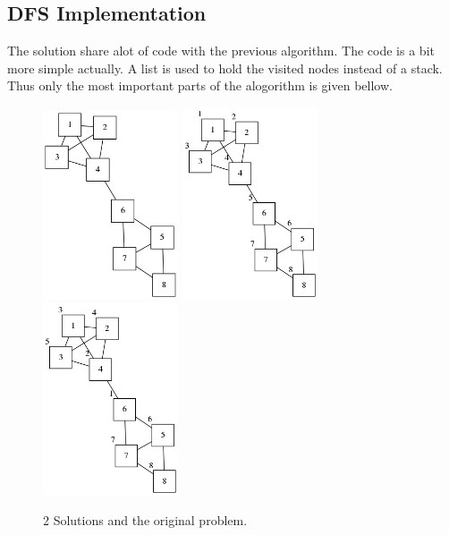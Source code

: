 \documentclass[a4paper,12pt]{article}
\begin{document}
\subsection*{DFS Implementation}
The solution share alot of code with the previous algorithm. The code is a bit more simple actually. A list is used to hold the visited nodes instead of a stack. Thus only the most important parts of the alogorithm is given bellow.
\begin{figure} 
	\centering
  \includegraphics[width=4cm]{code/DFS.png}	
	\includegraphics[width=4cm]{code/DFS-solution.png}
	\includegraphics[width=4cm]{code/DFS-solution2.png} 
	\caption{2 Solutions and the original problem.}	 
\end{figure}

 
 

\end{document}

